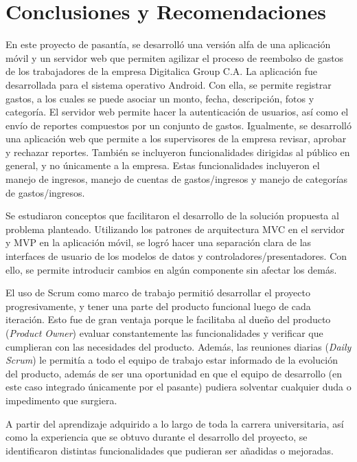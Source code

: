 \chapter{Conclusiones y Recomendaciones} \label{chap:conclusiones}

En este proyecto de pasantía, se desarrolló una versión alfa de una aplicación móvil y un servidor web que permiten agilizar el proceso de reembolso de gastos de los trabajadores de la empresa Digitalica Group C.A. La aplicación fue desarrollada para el sistema operativo Android. Con ella, se permite registrar gastos, a los cuales se puede asociar un monto, fecha, descripción, fotos y categoría. El servidor web permite hacer la autenticación de usuarios, así como el envío de reportes compuestos por un conjunto de gastos. Igualmente, se desarrolló una aplicación web que permite a los supervisores de la empresa revisar, aprobar y rechazar reportes. También se incluyeron funcionalidades dirigidas al público en general, y no únicamente a la empresa. Estas funcionalidades incluyeron el manejo de ingresos, manejo de cuentas de gastos/ingresos y manejo de categorías de gastos/ingresos.

Se estudiaron conceptos que facilitaron el desarrollo de la solución propuesta al problema planteado. Utilizando los patrones de arquitectura MVC en el servidor y MVP en la aplicación móvil, se logró hacer una separación clara de las interfaces de usuario de los modelos de datos y controladores/presentadores. Con ello, se permite introducir cambios en algún componente sin afectar los demás.


El uso de Scrum como marco de trabajo permitió desarrollar el proyecto progresivamente, y tener una parte del producto funcional luego de cada iteración. Esto fue de gran ventaja porque le facilitaba al dueño del producto (\textit{Product Owner}) evaluar constantemente las funcionalidades y verificar que cumplieran con las necesidades del producto. Además, las reuniones diarias (\textit{Daily Scrum}) le permitía a todo el equipo de trabajo estar informado de la evolución del producto, además de ser una oportunidad en que el equipo de desarrollo (en este caso integrado únicamente por el pasante) pudiera solventar cualquier duda o impedimento que surgiera.

A partir del aprendizaje adquirido a lo largo de toda la carrera universitaria, así como la experiencia que se obtuvo durante el desarrollo del proyecto, se identificaron distintas funcionalidades que pudieran ser añadidas o mejoradas.

